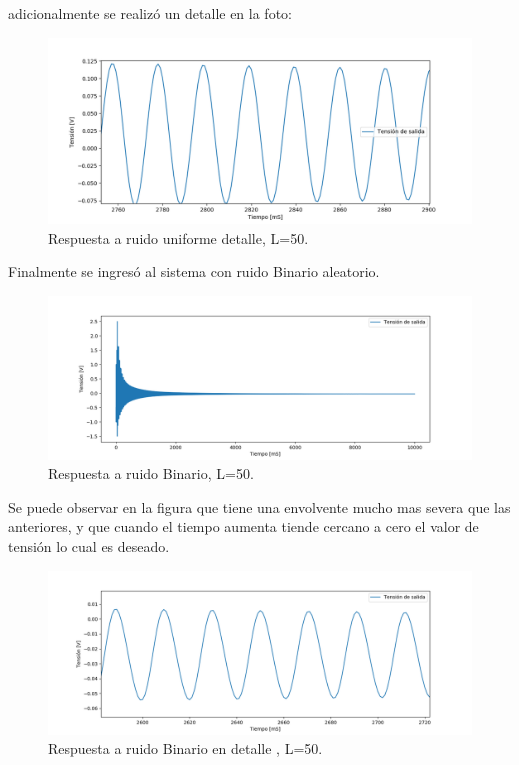 adicionalmente se realizó un detalle en la foto:
\begin{figure}[H]
	\centering
	\includegraphics[width=\textwidth]{ImagenesEjercicio4/uniformResponseDETAIL.PNG}
\caption{Respuesta a ruido uniforme detalle, L=50.}
	\label{fig:uniformed}
\end{figure}
Finalmente se ingresó al sistema con ruido Binario aleatorio.
\begin{figure}[H]
	\centering
	\includegraphics[width=\textwidth]{ImagenesEjercicio4/binaryResponse.PNG}
\caption{Respuesta a ruido Binario, L=50.}
	\label{fig:binary}
\end{figure}
Se puede observar en la figura que tiene una envolvente mucho mas severa que las anteriores, y que cuando el tiempo aumenta tiende cercano a cero el valor de tensión lo cual es deseado.
\begin{figure}[H]
	\centering
	\includegraphics[width=\textwidth]{ImagenesEjercicio4/binaryResponseDETAIL.PNG}
\caption{Respuesta a ruido Binario en detalle , L=50.}
	\label{fig:binaryD}
\end{figure}

